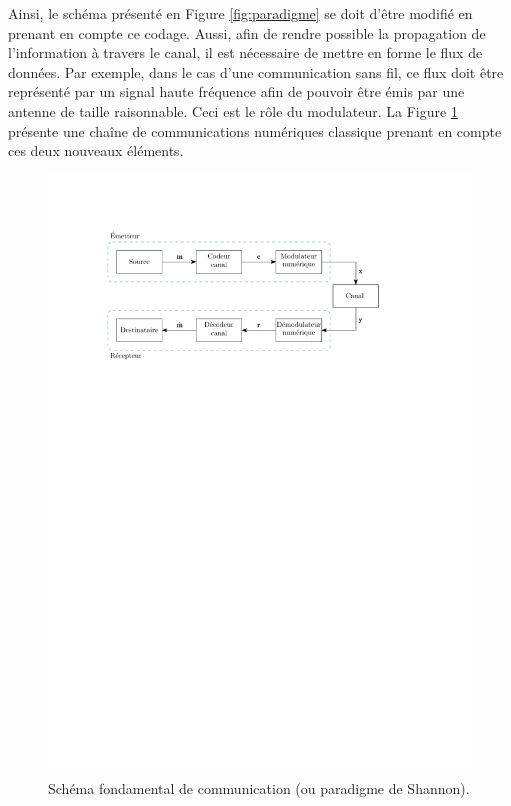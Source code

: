Ainsi, le schéma présenté en Figure \ref{fig:paradigme} se doit d'être modifié en prenant en compte ce codage. Aussi,
afin de rendre possible la propagation de l'information à travers le canal, il est nécessaire de mettre en forme le flux 
de données. Par exemple, dans le cas d'une communication sans fil, ce flux doit être représenté par un signal haute 
fréquence afin de pouvoir être émis par une antenne de taille raisonnable. Ceci est le rôle du modulateur.
La Figure \ref{fig:paradigme2} présente une chaîne de communications numériques classique prenant en compte ces deux
nouveaux éléments.
\begin{figure}[!h]
	\centering
	\includegraphics[width=12cm]{main/ch1_fig/shParadigm2.pdf}
	\caption{\label{fig:paradigme2} Schéma fondamental de communication (ou paradigme de Shannon).}
\end{figure}

